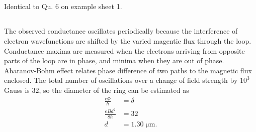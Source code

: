\documentclass[12pt]{article}
\begin{document}
        \subsection{} Identical to Qu. 6 on example sheet 1.
        \subsection{} The observed conductance oscillates periodically because the interference of electron wavefunctions are shifted by the varied magentic flux through the loop. Conductance maxima are measured when the electrons arriving from opposite parts of the loop are in phase, and minima when they are out of phase. Aharanov-Bohm effect relates phase difference of two paths to the magnetic flux enclosed. The total number of oscillations over a change of field strength by \(10^3\) Gauss is \(32\), so the diameter of the ring can be estimated as
        \begin{align*}
            \frac{e\Phi}{\hbar} &= \delta \\
            \frac{eB d^2}{8\hbar} &= 32\\ 
            d &= 1.30 \; \mathrm{\mu m}.
        \end{align*}
\end{document}
